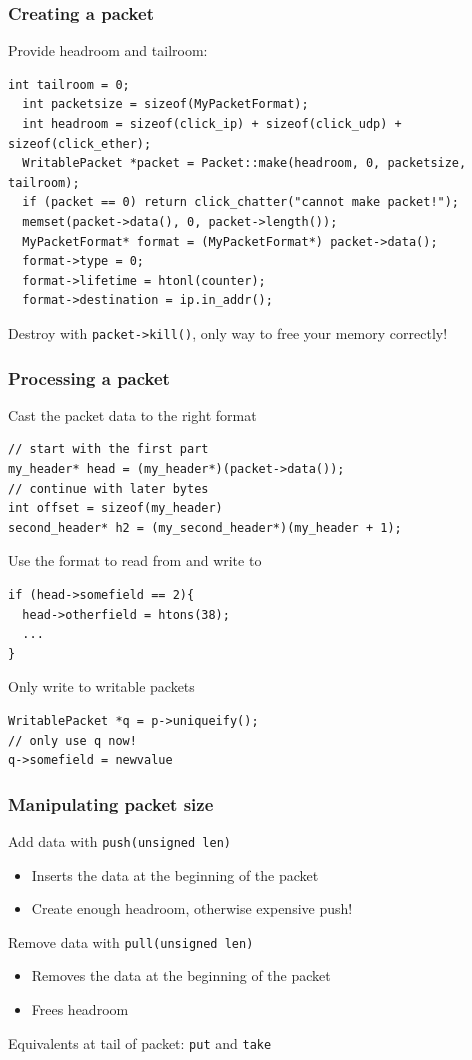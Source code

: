 \documentclass{beamer}
\begin{document}
\begin{frame}[fragile]
\frametitle{Creating a packet}
Provide headroom and tailroom:
\begin{lstlisting}[basicstyle=\tiny\ttfamily]
  int tailroom = 0;
  int packetsize = sizeof(MyPacketFormat);
  int headroom = sizeof(click_ip) + sizeof(click_udp) + sizeof(click_ether);
  WritablePacket *packet = Packet::make(headroom, 0, packetsize, tailroom);
  if (packet == 0) return click_chatter("cannot make packet!");
  memset(packet->data(), 0, packet->length());
  MyPacketFormat* format = (MyPacketFormat*) packet->data();
  format->type = 0;
  format->lifetime = htonl(counter);
  format->destination = ip.in_addr();
\end{lstlisting}
Destroy with \lstinline!packet->kill()!, only way to free your memory correctly!
\end{frame}

\begin{frame}
\frametitle{Processing a packet}
Cast the packet data to the right format
\begin{lstlisting}
// start with the first part
my_header* head = (my_header*)(packet->data());
// continue with later bytes
int offset = sizeof(my_header)
second_header* h2 = (my_second_header*)(my_header + 1);
\end{lstlisting}
Use the format to read from and write to
\begin{lstlisting}
if (head->somefield == 2){
  head->otherfield = htons(38);
  ...
}
\end{lstlisting}
\framebreak
Only write to writable packets
\begin{lstlisting}
WritablePacket *q = p->uniqueify();
// only use q now!
q->somefield = newvalue
\end{lstlisting}
\end{frame}

\begin{frame}[fragile]
\frametitle{Manipulating packet size}
Add data with \lstinline!push(unsigned len)!
\begin{itemize}
	\item Inserts the data at the beginning of the packet
	\item Create enough headroom, otherwise expensive push!
\end{itemize}
Remove data with \lstinline!pull(unsigned len)!
\begin{itemize}
	\item Removes the data at the beginning of the packet
	\item Frees headroom
\end{itemize}
Equivalents at tail of packet: \lstinline!put! and \lstinline!take!
\end{frame}
\end{document}
